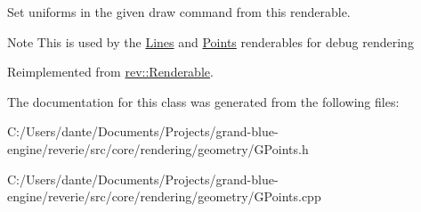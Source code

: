 Set uniforms in the given draw command from this renderable. 

\begin{DoxyNote}{Note}
This is used by the \mbox{\hyperlink{classrev_1_1_lines}{Lines}} and \mbox{\hyperlink{classrev_1_1_points}{Points}} renderables for debug rendering 
\end{DoxyNote}


Reimplemented from \mbox{\hyperlink{classrev_1_1_renderable_a4418624ac4442899026f95c20e065467}{rev\+::\+Renderable}}.



The documentation for this class was generated from the following files\+:\begin{DoxyCompactItemize}
\item 
C\+:/\+Users/dante/\+Documents/\+Projects/grand-\/blue-\/engine/reverie/src/core/rendering/geometry/G\+Points.\+h\item 
C\+:/\+Users/dante/\+Documents/\+Projects/grand-\/blue-\/engine/reverie/src/core/rendering/geometry/G\+Points.\+cpp\end{DoxyCompactItemize}
